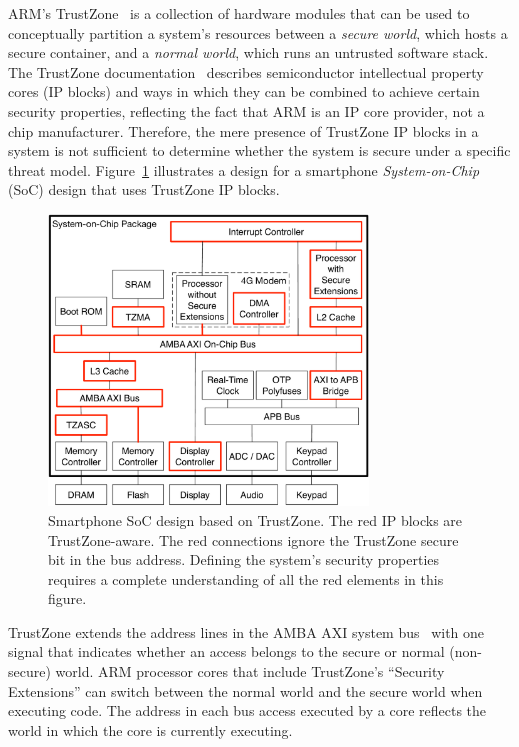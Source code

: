 \label{sec:sgx_related_trustzone}

ARM's TrustZone~\cite{alves2004trustzone} is a collection of hardware modules
that can be used to conceptually partition a system's resources between a
\textit{secure world}, which hosts a secure container, and a \textit{normal
world}, which runs an untrusted software stack. The TrustZone
documentation~\cite{arm2009trustzone} describes semiconductor intellectual
property cores (IP blocks) and ways in which they can be combined to achieve
certain security properties, reflecting the fact that ARM is an IP core
provider, not a chip manufacturer. Therefore, the mere presence of TrustZone IP
blocks in a system is not sufficient to determine whether the system is secure
under a specific threat model. Figure~\ref{fig:trustzone} illustrates a design
for a smartphone \textit{System-on-Chip} (SoC) design that uses TrustZone IP
blocks.

\begin{figure}[hbt]
  \centering
  \includegraphics[width=85mm]{figures/trustzone.pdf}
  \caption{
    Smartphone SoC design based on TrustZone. The red IP blocks are
    TrustZone-aware. The red connections ignore the TrustZone secure bit in the
    bus address. Defining the system's security properties requires a complete
    understanding of all the red elements in this figure.
  }
  \label{fig:trustzone}
\end{figure}

TrustZone extends the address lines in the AMBA AXI system
bus~\cite{arm2004ambaxi} with one signal that indicates whether an access
belongs to the secure or normal (non-secure) world. ARM processor cores that
include TrustZone's ``Security Extensions'' can switch between the normal world
and the secure world when executing code. The address in each bus access
executed by a core reflects the world in which the core is currently executing.

